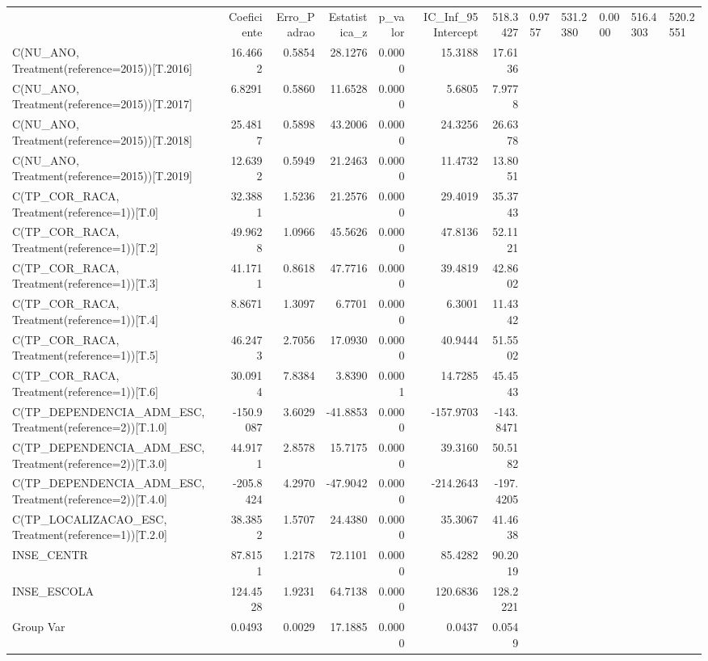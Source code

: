 \begin{tabular}{lrrrrrr}
\toprule
 & Coeficiente & Erro_Padrao & Estatistica_z & p_valor & IC_Inf_95%
\midrule
Intercept & 518.3427 & 0.9757 & 531.2380 & 0.0000 & 516.4303 & 520.2551 \\
C(NU_ANO, Treatment(reference=2015))[T.2016] & 16.4662 & 0.5854 & 28.1276 & 0.0000 & 15.3188 & 17.6136 \\
C(NU_ANO, Treatment(reference=2015))[T.2017] & 6.8291 & 0.5860 & 11.6528 & 0.0000 & 5.6805 & 7.9778 \\
C(NU_ANO, Treatment(reference=2015))[T.2018] & 25.4817 & 0.5898 & 43.2006 & 0.0000 & 24.3256 & 26.6378 \\
C(NU_ANO, Treatment(reference=2015))[T.2019] & 12.6392 & 0.5949 & 21.2463 & 0.0000 & 11.4732 & 13.8051 \\
C(TP_COR_RACA, Treatment(reference=1))[T.0] & 32.3881 & 1.5236 & 21.2576 & 0.0000 & 29.4019 & 35.3743 \\
C(TP_COR_RACA, Treatment(reference=1))[T.2] & 49.9628 & 1.0966 & 45.5626 & 0.0000 & 47.8136 & 52.1121 \\
C(TP_COR_RACA, Treatment(reference=1))[T.3] & 41.1711 & 0.8618 & 47.7716 & 0.0000 & 39.4819 & 42.8602 \\
C(TP_COR_RACA, Treatment(reference=1))[T.4] & 8.8671 & 1.3097 & 6.7701 & 0.0000 & 6.3001 & 11.4342 \\
C(TP_COR_RACA, Treatment(reference=1))[T.5] & 46.2473 & 2.7056 & 17.0930 & 0.0000 & 40.9444 & 51.5502 \\
C(TP_COR_RACA, Treatment(reference=1))[T.6] & 30.0914 & 7.8384 & 3.8390 & 0.0001 & 14.7285 & 45.4543 \\
C(TP_DEPENDENCIA_ADM_ESC, Treatment(reference=2))[T.1.0] & -150.9087 & 3.6029 & -41.8853 & 0.0000 & -157.9703 & -143.8471 \\
C(TP_DEPENDENCIA_ADM_ESC, Treatment(reference=2))[T.3.0] & 44.9171 & 2.8578 & 15.7175 & 0.0000 & 39.3160 & 50.5182 \\
C(TP_DEPENDENCIA_ADM_ESC, Treatment(reference=2))[T.4.0] & -205.8424 & 4.2970 & -47.9042 & 0.0000 & -214.2643 & -197.4205 \\
C(TP_LOCALIZACAO_ESC, Treatment(reference=1))[T.2.0] & 38.3852 & 1.5707 & 24.4380 & 0.0000 & 35.3067 & 41.4638 \\
INSE_CENTR & 87.8151 & 1.2178 & 72.1101 & 0.0000 & 85.4282 & 90.2019 \\
INSE_ESCOLA & 124.4528 & 1.9231 & 64.7138 & 0.0000 & 120.6836 & 128.2221 \\
Group Var & 0.0493 & 0.0029 & 17.1885 & 0.0000 & 0.0437 & 0.0549 \\
\bottomrule
\end{tabular}
